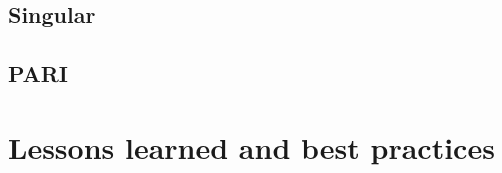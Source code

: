 \documentclass{deliverablereport}
\begin{document}



\subsection{Singular}



\subsection{PARI}


\hypertarget{best-practices}{%
\section{Lessons learned and best practices}\label{best-practices}}
\end{document}
